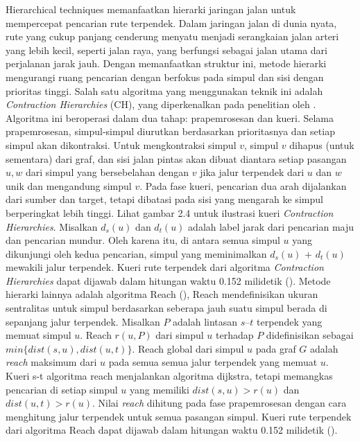 Hierarchical techniques memanfaatkan hierarki jaringan jalan untuk mempercepat pencarian rute terpendek. Dalam jaringan jalan di dunia nyata, rute yang cukup panjang cenderung menyatu menjadi serangkaian jalan arteri yang lebih kecil, seperti jalan raya, yang berfungsi sebagai jalan utama dari perjalanan jarak jauh. Dengan memanfaatkan struktur ini, metode hierarki mengurangi ruang pencarian dengan berfokus pada simpul dan sisi dengan prioritas tinggi. Salah satu algoritma yang menggunakan teknik ini adalah \textit{Contraction Hierarchies} (CH), yang diperkenalkan pada penelitian oleh \cite{Geisberger2012}. Algoritma ini beroperasi dalam dua tahap: prapemrosesan dan kueri. Selama prapemrosesan, simpul-simpul diurutkan berdasarkan prioritasnya dan setiap simpul akan dikontraksi. Untuk mengkontraksi simpul $v$, simpul $v$ dihapus (untuk sementara) dari graf, dan sisi jalan pintas akan dibuat diantara setiap pasangan $u, w$ dari simpul yang bersebelahan dengan $v$ jika jalur terpendek dari $u$ dan $w$ unik dan mengandung simpul $v$. Pada fase kueri, pencarian dua arah dijalankan dari sumber dan target, tetapi dibatasi pada sisi yang mengarah ke simpul berperingkat lebih tinggi. Lihat gambar 2.4 untuk ilustrasi kueri \textit{Contraction Hierarchies}. Misalkan $d_s(u)$ dan $d_t(u)$ adalah label jarak dari pencarian maju dan pencarian mundur. Oleh karena itu, di antara semua simpul $u$ yang dikunjungi oleh kedua pencarian, simpul yang meminimalkan $d_s(u)$ +  $d_t(u)$ mewakili jalur terpendek. Kueri rute terpendek dari algoritma \textit{Contraction Hierarchies} dapat dijawab dalam hitungan waktu 0.152 milidetik (\cite{Geisberger2012}). Metode hierarki lainnya adalah algoritma Reach (\cite{Gutman2004}), Reach mendefinisikan ukuran sentralitas untuk simpul berdasarkan seberapa jauh suatu simpul berada di sepanjang jalur terpendek. Misalkan $P$ adalah lintasan $s–t$ terpendek yang memuat simpul $u$. Reach $r(u,P)$ dari simpul $u$ terhadap $P$ didefinisikan sebagai $min\{dist(s,u), dist(u,t)\}$. Reach global dari simpul $u$ pada graf $G$ adalah \textit{reach} maksimum dari $u$ pada semua semua jalur terpendek yang memuat $u$. Kueri s-t algoritma reach menjalankan algoritma dijkstra, tetapi memangkas pencarian di setiap simpul $u$ yang memiliki $dist(s,u)>r(u)$ dan $dist(u,t)>r(u)$. Nilai \textit{reach} dihitung pada fase prapemrosesan dengan cara menghitung jalur terpendek untuk semua pasangan simpul. Kueri rute terpendek dari algoritma Reach dapat dijawab dalam hitungan waktu 0.152 milidetik (\cite{Bast2015}).



